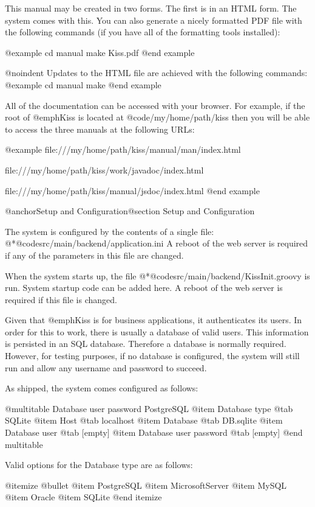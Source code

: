 This manual may be created in two forms.  The first is in an HTML
form.  The system comes with this.  You can also generate a nicely
formatted PDF file with the following commands (if you have all of the
formatting tools installed):

@example
cd manual
make Kiss.pdf
@end example

@noindent
Updates to the HTML file are achieved with the following commands:
@example
cd manual
make
@end example

All of the documentation can be accessed with your browser.  For
example, if the root of @emph{Kiss} is located at
@code{/my/home/path/kiss} then you will be able to access the three
manuals at the following URLs:

@example
file:///my/home/path/kiss/manual/man/index.html

file:///my/home/path/kiss/work/javadoc/index.html

file:///my/home/path/kiss/manual/jsdoc/index.html
@end example

@anchor{Setup and Configuration}@section Setup and Configuration

The system is configured by the contents of a single file:
@*@code{src/main/backend/application.ini} A reboot of the web server
is required if any of the parameters in this file are changed.

When the system starts up, the file
@*@code{src/main/backend/KissInit.groovy} is run.  System startup code can be added here.
A reboot of the web server
is required if this file is changed.

Given that @emph{Kiss} is for business applications, it authenticates its
users.  In order for this to work, there is usually a database of valid
users.  This information is persisted in an SQL database.  Therefore a
database is normally required.  However, for testing purposes, if no
database is configured, the system will still run and allow any
username and password to succeed.

As shipped, the system comes configured as follows:

@multitable {Database user password} {PostgreSQL} 
@item Database type
@tab SQLite
@item Host
@tab localhost
@item Database
@tab DB.sqlite
@item Database user
@tab [empty]
@item Database user password
@tab [empty]
@end multitable

Valid options for the Database type are as follows:

@itemize @bullet
@item
PostgreSQL
@item
MicrosoftServer
@item
MySQL
@item
Oracle
@item
SQLite
@end itemize

